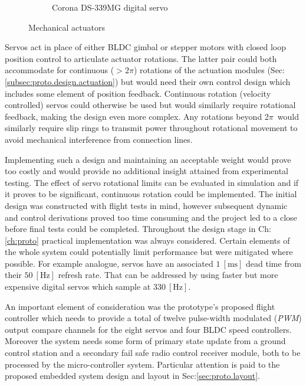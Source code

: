 \begin{figure}[hbtp]
\begin{subfigure}{0.5\textwidth}
\vspace{-6pt}
\caption{Corona DS-339MG digital servo~\cite{hobbyking}}
\label{fig:corona}
\end{subfigure}
\vspace{-8pt}
\caption{Mechanical actuators}
\vspace{-14pt}
\end{figure}
\par
Servos act in place of either BLDC gimbal or stepper motors with closed loop position control to articulate actuator rotations. The latter pair could both accommodate for continuous ($>2\pi$) rotations of the actuation modules (Sec:\ref{subsec:proto.design.actuation}) but would need their own control design which includes some element of position feedback. Continuous rotation (velocity controlled) servos could otherwise be used but would similarly require rotational feedback, making the design even more complex. Any rotations beyond 2$\pi$~would similarly require slip rings to transmit power throughout rotational movement to avoid mechanical interference from connection lines. 
\par
Implementing such a design and maintaining an acceptable weight would prove too costly and would provide no additional insight attained from experimental testing. The effect of servo rotational limits can be evaluated in simulation and if it proves to be significant, continuous rotation could be implemented. The initial design was constructed with flight tests in mind, however subsequent dynamic and control derivations proved too time consuming and the project led to a close before final tests could be completed. Throughout the design stage in Ch:\ref{ch:proto} practical implementation was always considered. Certain elements of the whole system could potentially limit performance but were mitigated where possible. For example analogue, servos have an associated $1~[\text{ms}]$ dead time from their $50~[\text{Hz}]$ refresh rate. That can be addressed by using faster but more expensive digital servos which sample at $330~[\text{Hz}]$. 
\par
An important element of consideration was the prototype's proposed flight controller which needs to provide a total of twelve pulse-width modulated (\emph{PWM}) output compare channels for the eight servos and four BLDC speed controllers.  Moreover the system needs some form of primary state update from a ground control station and a secondary fail safe radio control receiver module, both to be processed by the micro-controller system. Particular attention is paid to the proposed embedded system design and layout in Sec:\ref{sec:proto.layout}.
